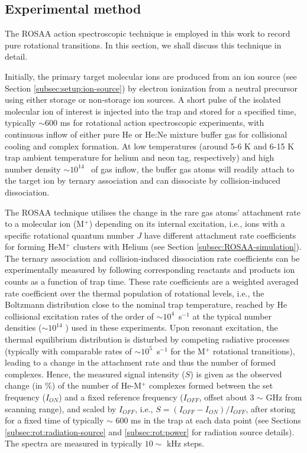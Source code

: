 \subsection{Experimental method}
\label{subsec:ROSAA}

The ROSAA action spectroscopic technique is employed in this work to record pure rotational transitions. In this section, we shall discuss this technique in detail.

Initially, the primary target molecular ions are produced from an ion source (see Section \ref{subsec:setup:ion-source}) by electron ionization from a neutral precursor using either storage or non-storage ion sources. A short pulse of the isolated molecular ion of interest is injected into the trap and stored for a specified time, typically $\sim 600$ ms for rotational action spectroscopic experiments, with continuous inflow of either pure He or He:Ne mixture buffer gas for collisional cooling and complex formation. At low temperatures (around 5-6 K and 6-15 K trap ambient temperature for helium and neon tag, respectively) and high number density $\sim10^{14}$ \percc\ of gas inflow, the buffer gas atoms will readily attach to the target ion by ternary association and can dissociate by collision-induced dissociation.

The ROSAA technique utilises the change in the rare gas atoms' attachment rate to a molecular ion (M$^+$) depending on its internal excitation, i.e., ions with a specific rotational quantum number $J$ have different attachment rate coefficients for forming HeM$^+$ clusters with Helium (see Section \ref{subsec:ROSAA-simulation}). The ternary association and collision-induced dissociation rate coefficients can be experimentally measured by following corresponding reactants and products ion counts as a function of trap time. These rate coefficients are a weighted averaged rate coefficient over the thermal population of rotational levels, i.e., the Boltzmann distribution close to the nominal trap temperature, reached by He collisional excitation rates of the order of $\sim 10^4$~s$^{-1}$ at the typical number densities ($\sim 10^{14}$ \percc) used in these experiments. Upon resonant excitation, the thermal equilibrium distribution is disturbed by competing radiative processes (typically with comparable rates of $\sim 10^5$~s$^{-1}$ for the M$^+$ rotational transitions), leading to a change in the attachment rate and thus the number of formed complexes. Hence, the measured signal intensity ($S$) is given as the observed change (in \%) of the number of He-M$^+$ complexes formed between the set frequency ($I_{ON}$) and a fixed reference frequency ($I_{OFF}$, offset about 3 $\sim$ GHz from scanning range), and scaled by $I_{OFF}$, i.e., $ S=(I_{OFF} - I_{ON})/I_{OFF} $, after storing for a fixed time of typically $\sim$ 600 ms in the trap at each data point (see Sections \ref{subsec:rot:radiation-source} and \ref{subsec:rot:power} for radiation source details). The spectra are measured in typically $10\sim$ kHz steps.

